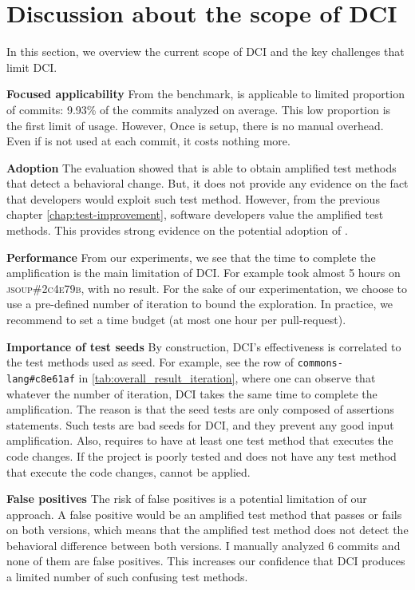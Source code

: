 

\section{Discussion about the scope of DCI}
\label{sec:limitation}

In this section, we overview the current scope of DCI and the key challenges that limit DCI.

\textbf{Focused applicability}
From the benchmark, \DCI is applicable to limited proportion of commits: 9.93\% of the commits analyzed  on average.
This low proportion is the first limit of \DCI usage.
However, Once \DCI is setup, there is no manual overhead.
Even if \DCI is not used at each commit, it costs nothing more.

\textbf{Adoption}
The evaluation showed that \DCI is able to obtain amplified test methods that detect a behavioral change.
But, it does not provide any evidence on the fact that developers would exploit such test method.
However, from the previous chapter \autoref{chap:test-improvement}, software developers value the amplified test methods.
This provides strong evidence on the potential adoption of \DCI.

\textbf{Performance}
From our experiments, we see that the time  to complete the amplification is the main limitation of DCI. For example \DCI took almost 5 hours on
\textsc{jsoup\#2c4e79b},  with no result.
For the sake of our experimentation, we choose to use a pre-defined number of iteration to bound the exploration.
In practice, we recommend to set a time budget (\eg at most one hour per pull-request).

\textbf{Importance of test seeds}
By construction, DCI's effectiveness is correlated to the test methods used as seed.
For example, see the row of \texttt{commons-lang\#c8e61af} in \autoref{tab:overall_result_iteration}, where one can observe that whatever the number of iteration, DCI takes the same time to complete the amplification.
The reason is that the seed tests are only composed of assertions statements.
Such tests are bad seeds for DCI, and they prevent any good input amplification.
Also, \DCI requires to have at least one test method that executes the code changes.
If the project is poorly tested and does not have any test method that execute the code changes, \DCI cannot be applied.

\textbf{False positives}
The risk of false positives is a potential  limitation of our approach.
A false positive would be an amplified test method that passes or fails on both versions, which means that the amplified test method does not detect the behavioral difference between both versions.
I manually analyzed 6 commits and none of them are false positives.
This increases our confidence that DCI produces a limited number of such confusing test methods.

